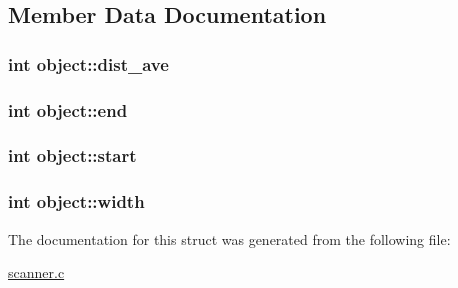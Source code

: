 \subsection{Member Data Documentation}
\hypertarget{structobject_a359d1105e92c540fb16c03ff59a5d9e0}{
\subsubsection[{dist\_\-ave}]{\setlength{\rightskip}{0pt plus 5cm}int {\bf object::dist\_\-ave}}}
\label{structobject_a359d1105e92c540fb16c03ff59a5d9e0}
\hypertarget{structobject_a717decadf98785544486cb36e1c4e5c4}{
\subsubsection[{end}]{\setlength{\rightskip}{0pt plus 5cm}int {\bf object::end}}}
\label{structobject_a717decadf98785544486cb36e1c4e5c4}
\hypertarget{structobject_a8c7c0bcdde914c29f95fbf1606495dc6}{
\subsubsection[{start}]{\setlength{\rightskip}{0pt plus 5cm}int {\bf object::start}}}
\label{structobject_a8c7c0bcdde914c29f95fbf1606495dc6}
\hypertarget{structobject_a609f10330b355e8dc16f62af1378df40}{
\subsubsection[{width}]{\setlength{\rightskip}{0pt plus 5cm}int {\bf object::width}}}
\label{structobject_a609f10330b355e8dc16f62af1378df40}


The documentation for this struct was generated from the following file:\begin{DoxyCompactItemize}
\item 
\hyperlink{scanner_8c}{scanner.c}\end{DoxyCompactItemize}
